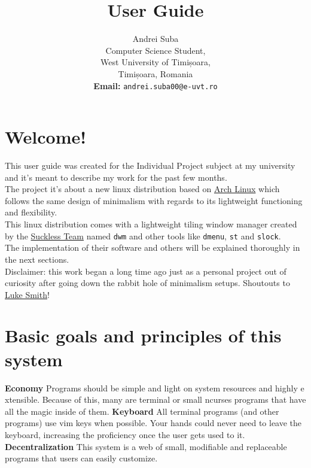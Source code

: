 \documentclass[11pt]{article}
\title{\textbf{User Guide}}
\author{Andrei Suba\\
    Computer Science Student,\\
	West University of Timișoara,\\
	Timișoara, Romania\\
	\textbf{Email:} \texttt{andrei.suba00@e-uvt.ro}
    }
\date{}
\begin{document}
\maketitle
\thispagestyle{empty}

\clearpage

\tableofcontents

\clearpage

\section{Welcome!}
This user guide was created for the Individual Project subject at my university and it's meant
to describe my work for the past few months.\\
The project it's about a new linux distribution based on \href{https://archlinux.org/}{Arch Linux} which
follows the same design of minimalism with regards to its lightweight functioning and flexibility.\\
This linux distribution comes with a lightweight tiling window manager created by the \href{https://suckless.org/}{Suckless Team} named \texttt{dwm} and other tools like \texttt{dmenu}, \texttt{st} and \texttt{slock}.\\
The implementation of their software and others will be explained thoroughly in the next sections.\\
\newline
Disclaimer: this work began a long time ago just as a personal project out of curiosity after going down the 
rabbit hole of minimalism setups. Shoutouts to \href{https://lukesmith.xyz/}{Luke Smith}!

\section{Basic goals and principles of this system}

\noindent\textbf{Economy}
\newline
Programs should be simple and light on system resources and highly e xtensible.
Because of this, many are terminal or small ncurses programs that have all the magic inside
of them.
\newline
\newline
\noindent\textbf{Keyboard}
\newline
All terminal programs (and other programs) use vim keys when possible. Your hands could never need to leave the keyboard, increasing the proficiency once the user gets used to it.
\newline
\newline
\noindent\textbf{Decentralization}
\newline
This system is a web of small, modifiable and replaceable programs that users can easily customize.
\end{document}
